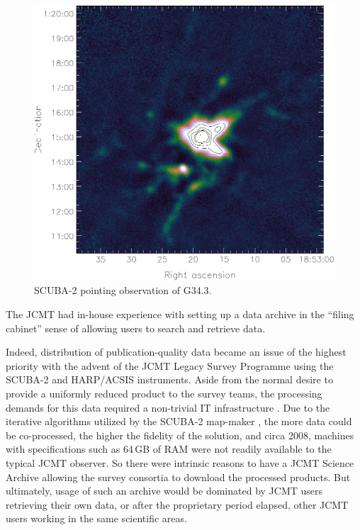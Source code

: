 \documentclass[final,authoryear,5p,times,twocolumn]{elsarticle}
\begin{document}
\begin{figure}[t]
\includegraphics[width=\columnwidth]{g34}
\caption{SCUBA-2 pointing observation of G34.3.}
\label{fig:g34}
\end{figure}

The JCMT had in-house experience with setting up a data archive in the
``filing cabinet'' sense of allowing users to search and retrieve data.

Indeed, distribution of publication-quality data became an issue of
the highest priority with the advent of the JCMT Legacy Survey
Programme \citep{2010HiA....15..797C,2008ASPC..394..450E} using the
SCUBA-2 and HARP/ACSIS \citep{2009MNRAS.399.1026B} instruments. Aside
from the normal desire to provide a uniformly reduced product to the
survey teams, the processing demands for this data required a
non-trivial IT infrastructure . Due to the iterative algorithms
utilized by the SCUBA-2 map-maker
\citep[SMURF;][]{2013MNRAS.430.2545C}, the more data could be
co-processed, the higher the fidelity of the solution, and circa 2008,
machines with specifications such as 64\,GB of RAM were not readily
available to the typical JCMT observer. So there were intrinsic
reasons to have a JCMT Science Archive allowing the survey consortia
to download the processed products. But ultimately, usage of such an
archive would be dominated by JCMT users retrieving their own data, or
after the proprietary period elapsed, other JCMT users working in the
same scientific areas.
\end{document}
